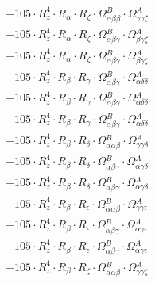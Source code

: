 \documentclass{article}
\begin{document}
\begin{subequations}
\begin{gather}
\begin{array}{c}
 \\[0.2em] 		 + 105 \cdot R_{z}^{4} \cdot R_{\alpha{}} \cdot R_{\zeta{}} \cdot \Omega{}^{B}_{\alpha{}\beta{}\beta{}} \cdot \Omega{}^{A}_{\gamma{}\gamma{}\zeta{}} 
 \\[0.2em] 		 + 105 \cdot R_{z}^{4} \cdot R_{\alpha{}} \cdot R_{\zeta{}} \cdot \Omega{}^{B}_{\alpha{}\beta{}\gamma{}} \cdot \Omega{}^{A}_{\beta{}\gamma{}\zeta{}} 
 \\[0.2em] 		 + 105 \cdot R_{z}^{4} \cdot R_{\alpha{}} \cdot R_{\zeta{}} \cdot \Omega{}^{B}_{\alpha{}\beta{}\gamma{}} \cdot \Omega{}^{A}_{\beta{}\gamma{}\zeta{}} 
 \\[0.2em] 		 + 105 \cdot R_{z}^{4} \cdot R_{\beta{}} \cdot R_{\gamma{}} \cdot \Omega{}^{B}_{\alpha{}\beta{}\gamma{}} \cdot \Omega{}^{A}_{\alpha{}\delta{}\delta{}} 
 \\[0.2em] 		 + 105 \cdot R_{z}^{4} \cdot R_{\beta{}} \cdot R_{\gamma{}} \cdot \Omega{}^{B}_{\alpha{}\beta{}\gamma{}} \cdot \Omega{}^{A}_{\alpha{}\delta{}\delta{}} 
 \\[0.2em] 		 + 105 \cdot R_{z}^{4} \cdot R_{\beta{}} \cdot R_{\gamma{}} \cdot \Omega{}^{B}_{\alpha{}\beta{}\gamma{}} \cdot \Omega{}^{A}_{\alpha{}\delta{}\delta{}} 
 \\[0.2em] 		 + 105 \cdot R_{z}^{4} \cdot R_{\beta{}} \cdot R_{\delta{}} \cdot \Omega{}^{B}_{\alpha{}\alpha{}\beta{}} \cdot \Omega{}^{A}_{\gamma{}\gamma{}\delta{}} 
 \\[0.2em] 		 + 105 \cdot R_{z}^{4} \cdot R_{\beta{}} \cdot R_{\delta{}} \cdot \Omega{}^{B}_{\alpha{}\beta{}\gamma{}} \cdot \Omega{}^{A}_{\alpha{}\gamma{}\delta{}} 
 \\[0.2em] 		 + 105 \cdot R_{z}^{4} \cdot R_{\beta{}} \cdot R_{\delta{}} \cdot \Omega{}^{B}_{\alpha{}\beta{}\gamma{}} \cdot \Omega{}^{A}_{\alpha{}\gamma{}\delta{}} 
 \\[0.2em] 		 + 105 \cdot R_{z}^{4} \cdot R_{\beta{}} \cdot R_{\epsilon{}} \cdot \Omega{}^{B}_{\alpha{}\alpha{}\beta{}} \cdot \Omega{}^{A}_{\gamma{}\gamma{}\epsilon{}} 
 \\[0.2em] 		 + 105 \cdot R_{z}^{4} \cdot R_{\beta{}} \cdot R_{\epsilon{}} \cdot \Omega{}^{B}_{\alpha{}\beta{}\gamma{}} \cdot \Omega{}^{A}_{\alpha{}\gamma{}\epsilon{}} 
 \\[0.2em] 		 + 105 \cdot R_{z}^{4} \cdot R_{\beta{}} \cdot R_{\epsilon{}} \cdot \Omega{}^{B}_{\alpha{}\beta{}\gamma{}} \cdot \Omega{}^{A}_{\alpha{}\gamma{}\epsilon{}} 
 \\[0.2em] 		 + 105 \cdot R_{z}^{4} \cdot R_{\beta{}} \cdot R_{\zeta{}} \cdot \Omega{}^{B}_{\alpha{}\alpha{}\beta{}} \cdot \Omega{}^{A}_{\gamma{}\gamma{}\zeta{}} 

\end{array}
\end{gather}
\end{subequations}
\end{document}
